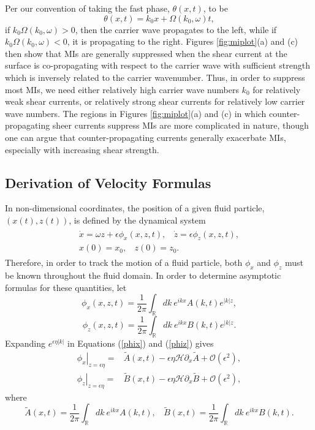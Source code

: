 \documentclass{JFM_Style/jfm}
\newcommand{\pd}{\partial}
\begin{document}
Per our convention of taking the fast phase, $\theta(x,t)$, to be
\[
\theta(x,t) = k_{0}x + \Omega(k_{0},\omega) t,
\]
if $k_{0}\Omega(k_{0},\omega)>0$, then the carrier wave propagates to the left, while if $k_0 \Omega(k_{0},\omega)<0$, it is propagating to the right.  Figures \ref{fig:miplot}(a) and (c) then show that MIs are generally suppressed when the shear current at the surface is co-propagating with respect to the carrier wave with sufficient strength which is inversely related to the carrier wavenumber.  Thus, in order to suppress most MIs, we need either relatively high carrier wave numbers $k_{0}$ for relatively weak shear currents, or relatively strong shear currents for relatively low carrier wave numbers.  The regions in Figures \ref{fig:miplot}(a) and (c) in which counter-propagating sheer currents suppress MIs are more complicated in nature, though one can argue that counter-propagating currents generally exacerbate MIs, especially with increasing shear strength.  
\subsection{Derivation of Velocity Formulas}
In non-dimensional coordinates, the position of a given fluid particle, $(x(t),z(t))$, is defined by the dynamical system 
\begin{align}
\begin{split}
\dot{x} = \omega z + \epsilon \phi_{x}(x,z,t), ~~~~ \dot{z} = \epsilon\phi_{z}(x,z,t),\\
x(0) =x_0,~~~~ z(0)=z_0.
\end{split}
\label{system}
\end{align}
Therefore, in order to track the motion of a fluid particle, both $\phi_x$ and $\phi_z$ must be known throughout the fluid domain.  In order to determine asymptotic formulas for these quantities, let
\begin{equation}
\phi_{x}(x,z,t) = \frac{1}{2\pi}\int_{\mathbb{R}}dk~ e^{ikx} A(k,t)e^{|k|z},
\label{phix}
\end{equation}
\begin{equation}
\phi_{z}(x,z,t) = \frac{1}{2\pi}\int_{\mathbb{R}}dk~ e^{ikx} B(k,t)e^{|k|z}.
\label{phiz}
\end{equation}
Expanding $e^{\epsilon \eta |k|}$ in Equations (\ref{phix}) and (\ref{phiz}) gives
\begin{align}
\left.\phi_{x}\right|_{z=\epsilon\eta} = & \tilde{A}(x,t) - \epsilon\eta\mathcal{H}\pd_{x}\tilde{A} +\mathcal{O}(\epsilon^{2}),\label{phixsurfsol}\\
\left.\phi_{z}\right|_{z=\epsilon\eta} = & \tilde{B}(x,t) - \epsilon\eta\mathcal{H}\pd_{x}\tilde{B} +\mathcal{O}(\epsilon^{2}),\label{phizsurfsol}
\end{align}
where
\[
\tilde{A}(x,t) = \frac{1}{2\pi}\int_{\mathbb{R}}dk~ e^{ikx} A(k,t), ~~~~ \tilde{B}(x,t) = \frac{1}{2\pi}\int_{\mathbb{R}}dk~ e^{ikx} B(k,t).
\]
\end{document}
